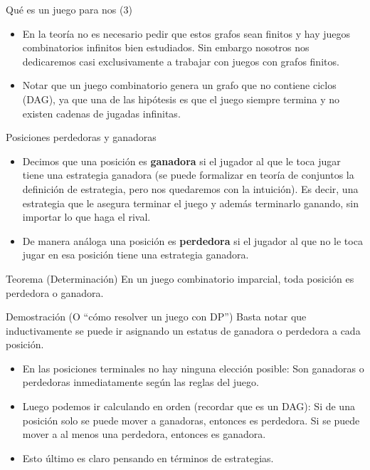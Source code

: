 \documentclass{beamer}
\begin{document}
\begin{frame}{Qué es un juego para nos (3)}
  \begin{itemize}
  \item En la teoría no es necesario pedir que estos grafos sean finitos y hay juegos combinatorios infinitos bien estudiados. Sin
  embargo nosotros nos dedicaremos casi exclusivamente a trabajar con juegos con grafos finitos.
  \item Notar que un juego combinatorio genera un grafo que no contiene ciclos (DAG), ya que una de las hipótesis es que el juego
  siempre termina y no existen cadenas de jugadas infinitas.
  \end{itemize}
\end{frame}

\begin{frame}{Posiciones perdedoras y ganadoras}
  \begin{itemize}
  \item Decimos que una posición es \textbf{ganadora} si el jugador al que le toca jugar tiene una estrategia ganadora (se puede
  formalizar en teoría de conjuntos la definición de estrategia, pero nos quedaremos con la intuición). Es decir, una estrategia
  que le asegura terminar el juego y además terminarlo ganando, sin importar lo que haga el rival.
  \item De manera análoga una posición es \textbf{perdedora} si el jugador al que no le toca jugar en esa posición tiene una estrategia
  ganadora.
  \end{itemize}
  \begin{block}{Teorema (Determinación)}
    En un juego combinatorio imparcial, toda posición es perdedora o ganadora.
  \end{block}
\end{frame}

\begin{frame}{Demostración (O ``cómo resolver un juego con DP'')}
  Basta notar que inductivamente se puede ir asignando un estatus de ganadora o perdedora a cada posición.
  \begin{itemize}
  \item En las posiciones terminales no hay ninguna elección posible: Son ganadoras o perdedoras inmediatamente según las reglas del juego.
  \item Luego podemos ir calculando en orden (recordar que es un DAG): Si de una posición solo se puede mover a ganadoras, entonces es perdedora.
  Si se puede mover a al menos una perdedora, entonces es ganadora.
  \item Esto último es claro pensando en términos de estrategias.
  \end{itemize}
\end{frame}
\end{document}
